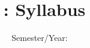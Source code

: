 {
\usepackage{fullpage}
}

{

}

\usepackage{calendar}
\usepackage{datenumber}



\title[Syllabus] %
{\course~\coursename: Syllabus}

\author[\instructorshort]%
{\instructorlong}

\institute[\instituteshort] %
{\institutelong}

\date %
{Semester/Year: \semesteryear}













\begin{frame}
  \titlepage
\end{frame}




